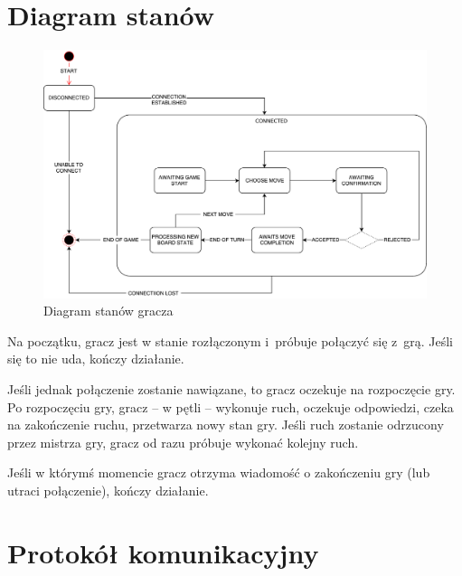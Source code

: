 \documentclass[a4paper]{article}
\begin{document}
\section{Diagram stanów}
\begin{figure}[H]
\caption{Diagram stanów gracza}
\centering
\includegraphics[scale=0.5]{state_diagram_player.pdf}
\end{figure}

Na początku, gracz jest w stanie rozłączonym i~próbuje połączyć się z~grą.
Jeśli się to nie uda, kończy działanie.

Jeśli jednak połączenie zostanie nawiązane, to gracz oczekuje na rozpoczęcie gry.
Po rozpoczęciu gry, gracz -- w pętli -- wykonuje ruch, oczekuje odpowiedzi, czeka na zakończenie ruchu, przetwarza nowy stan gry.
Jeśli ruch zostanie odrzucony przez mistrza gry, gracz od razu próbuje wykonać kolejny ruch.

Jeśli w którymś momencie gracz otrzyma wiadomość o zakończeniu gry (lub utraci połączenie), kończy działanie.

\section{Protokół komunikacyjny}
\end{document}
